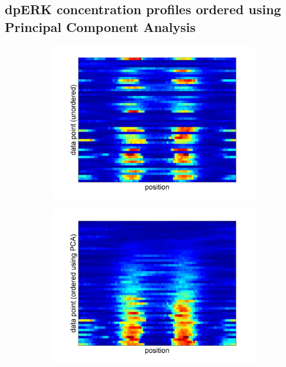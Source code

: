 \documentclass[10pt]{article}
\begin{document}
\subsection*{dpERK concentration profiles ordered using Principal Component Analysis}
\begin{figure}[H]
\begin{subfigure}{0.3\textwidth}
\includegraphics[width=\textwidth]{data_unordered}
\caption{}
\end{subfigure}
\begin{subfigure}{0.3\textwidth}
\includegraphics[width=\textwidth]{data_ordered_PCA}
\caption{}
\end{subfigure}
\begin{subfigure}{0.3\textwidth}

\end{subfigure}
\end{figure}
\end{document}
